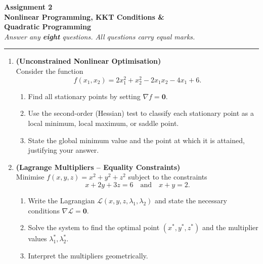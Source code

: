 \documentclass[12pt,a4paper]{article}
\begin{document}
\begin{center}
  {\LARGE \textbf{Assignment 2}}\\[4pt]
  {\large \textbf{Nonlinear Programming, KKT Conditions \&}}\\
  {\large \textbf{Quadratic Programming}}\\[4pt]
  \textit{Answer any \textbf{eight} questions. All questions carry equal marks.}
\end{center}

\medskip\hrule\medskip

\begin{enumerate}[leftmargin=*, label=\textbf{Q.\arabic*.}]

\item \textbf{(Unconstrained Nonlinear Optimisation)}\\
  Consider the function
  \[
    f(x_1, x_2) = 2x_1^2 + x_2^2 - 2x_1 x_2 - 4x_1 + 6.
  \]
  \begin{enumerate}[label=(\alph*)]
    \item Find all stationary points by setting $\nabla f = \mathbf{0}$.
    \item Use the second-order (Hessian) test to classify each stationary
          point as a local minimum, local maximum, or saddle point.
    \item State the global minimum value and the point at which it is attained,
          justifying your answer.
  \end{enumerate}

\item \textbf{(Lagrange Multipliers -- Equality Constraints)}\\
  Minimise $f(x,y,z) = x^2 + y^2 + z^2$ subject to the constraints
  \[
    x + 2y + 3z = 6 \quad \text{and} \quad x + y = 2.
  \]
  \begin{enumerate}[label=(\alph*)]
    \item Write the Lagrangian $\mathcal{L}(x,y,z,\lambda_1,\lambda_2)$ and
          state the necessary conditions $\nabla \mathcal{L} = \mathbf{0}$.
    \item Solve the system to find the optimal point $(x^*, y^*, z^*)$ and
          the multiplier values $\lambda_1^*, \lambda_2^*$.
    \item Interpret the multipliers geometrically.
  \end{enumerate}


\end{enumerate}
\end{document}
